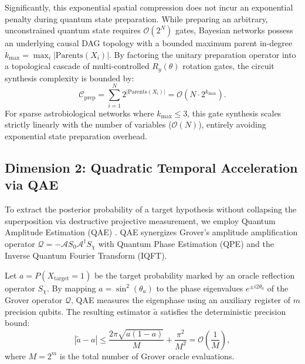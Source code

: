 Significantly, this exponential spatial compression does not incur an exponential penalty during quantum state preparation. While preparing an arbitrary, unconstrained quantum state requires $\mathcal{O}(2^N)$ gates, Bayesian networks possess an underlying causal DAG topology with a bounded maximum parent in-degree $k_{\max} = \max_i |\mathrm{Parents}(X_i)|$. By factoring the unitary preparation operator into a topological cascade of multi-controlled $R_y(\theta)$ rotation gates, the circuit synthesis complexity is bounded by:
\begin{equation}
\mathcal{C}_{\mathrm{prep}} = \sum_{i=1}^N 2^{|\mathrm{Parents}(X_i)|} = \mathcal{O}\left(N \cdot 2^{k_{\max}}\right).
\label{eq:state_prep_complexity_ch1}
\end{equation}
For sparse astrobiological networks where $k_{\max} \le 3$, this gate synthesis scales strictly linearly with the number of variables ($\mathcal{O}(N)$), entirely avoiding exponential state preparation overhead.

\subsection{Dimension 2: Quadratic Temporal Acceleration via QAE}
To extract the posterior probability of a target hypothesis without collapsing the superposition via destructive projective measurement, we employ Quantum Amplitude Estimation (QAE) \cite{brassard2002}. QAE synergizes Grover's amplitude amplification operator $\mathcal{Q} = -\mathcal{A} S_0 \mathcal{A}^\dagger S_\chi$ with Quantum Phase Estimation (QPE) and the Inverse Quantum Fourier Transform (IQFT).

Let $a = P(X_{\mathrm{target}} = 1)$ be the target probability marked by an oracle reflection operator $S_\chi$. By mapping $a = \sin^2(\theta_a)$ to the phase eigenvalues $e^{\pm i 2\theta_a}$ of the Grover operator $\mathcal{Q}$, QAE measures the eigenphase using an auxiliary register of $m$ precision qubits. The resulting estimator $\tilde{a}$ satisfies the deterministic precision bound:
\begin{equation}
|\tilde{a} - a| \le \frac{2\pi \sqrt{a(1-a)}}{M} + \frac{\pi^2}{M^2} = \mathcal{O}\left(\frac{1}{M}\right),
\label{eq:qae_quadratic_bound_ch1}
\end{equation}
where $M = 2^m$ is the total number of Grover oracle evaluations. 

